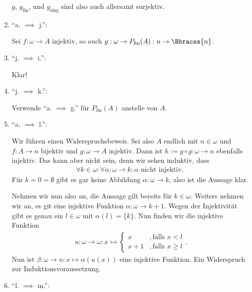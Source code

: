 \begin{solution}
\begin{enumerate}[label = \texttt{ad}]
	$g$, $g_\mathrm{fin}$, und $g_\mathrm{sing}$ sind also auch allersamt surjektiv.
	
	\item \enquote{a. $\implies$ j.}:
	
	Sei $f: \omega \to A$ injektiv, so auch $g: \omega \to P_\mathrm{fin}(A): n \to \Bbraces{n}$.
	
	\item \enquote{j. $\implies$ i.}:
	
	Klar!
	
	\item \enquote{j. $\implies$ k.}:
	
	Verwende \enquote{a. $\implies$ g.} für $P_\mathrm{fin}(A)$ anstelle von $A$.
	
	\item \enquote{a. $\implies$ l.}:
	
	Wir führen einen Widerspruchsbeweis. Sei also $A$ endlich mit $n \in \omega$ und $f: A \to n$ bijektiv und $g: \omega \to A$ injektiv. Dann ist $h:= g \circ g: \omega \to n$ ebenfalls injektiv. Das kann aber nicht sein, denn wir sehen induktiv, dass
	\begin{align*}
		\forall k \in \omega: \forall \alpha: \omega \to k: \alpha \text{ nicht injektiv. }
	\end{align*}
	Für $k = 0 = \emptyset$ gibt es gar keine Abbildung $\alpha: \omega \to k$, also ist die Aussage klar.
	
	Nehmen wir nun also an, die Aussage gilt bereits für $k \in \omega$. Weiters nehmen wir an, es git eine injektive Funktion $\alpha: \omega \to k + 1$. Wegen der Injektivität gibt es genau ein $l \in \omega$ mit $\alpha(l) = \{k\}$. Nun finden wir die injektive Funktion 
	\begin{align*}
		u: \omega \to \omega: x \mapsto
		\begin{cases}
			x &, \text{falls } x < l \\
			x + 1 &, \text{falls } x \geq l
		\end{cases}.
	\end{align*}
	Nun ist $\beta: \omega \to n: x \mapsto \alpha(u(x))$ eine injektive Funktion. Ein Widerspruch zur Induktionsvoraussetzung. 
	
	\item \enquote{l. $\implies$ m.}:
	

\end{enumerate}
\end{solution}
